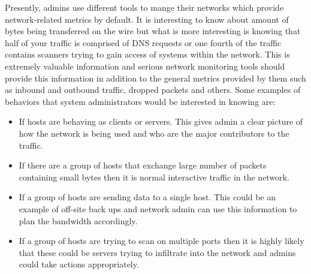 Presently, admins use different tools to mange their networks which provide network-related metrics by default. It is interesting to know about amount of bytes being transferred on the wire but what is more interesting is knowing that half of your traffic is comprised of DNS requests or one fourth of the traffic contains scanners trying to gain access of systems within the network. This is extremely valuable information and serious network monitoring tools should provide this information in addition to the general metrics provided by them such as inbound and outbound traffic, dropped packets and others. Some examples of behaviors that system administrators would be interested in knowing are:
\begin{itemize}
	\item If hosts are behaving as clients or servers. This gives admin a clear picture of how the network is being used and who are the major contributors to the traffic.
	\item If there are a group of hosts that exchange large number of packets containing small bytes then it is normal interactive traffic in the network.	
	\item If a group of hosts are sending data to a single host. This could be an example of off-site back ups and network admin can use this information to plan the bandwidth accordingly.
	\item If a group of hosts are trying to scan on multiple ports then it is highly likely that these could be servers trying to infiltrate into the network and admins could take actions appropriately.
	
\end{itemize}

